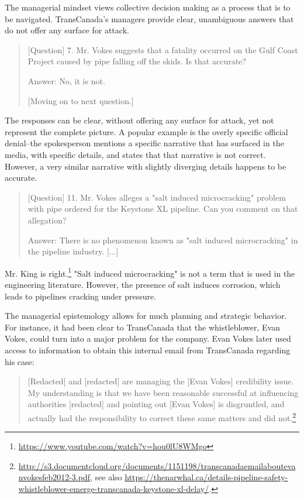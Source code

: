 \documentclass{article}
\begin{document}
	The managerial mindset views collective decision making as a process that is to be navigated. TransCanada's managers provide clear, unambiguous answers that do not offer any surface for attack.

	\begin{quote}
		[Question] 7. Mr. Vokes suggests that a fatality occurred on the Gulf Coast Project caused by pipe falling off the skids. Is that accurate? 

		Answer: No, it is not. 

		[Moving on to next question.]

		\citep[p. 4]{King2015a}
	\end{quote}

	The responses can be clear, without offering any surface for attack, yet not represent the complete picture. A popular example is the overly specific official denial--the spokesperson mentions a specific narrative that has surfaced in the media, with specific details, and states that that narrative is not correct. However, a very similar narrative with slightly diverging details happens to be accurate.

	\begin{quote}
		[Question] 11. Mr. Vokes alleges a "salt induced microcracking" problem with pipe ordered for the Keystone XL pipeline. Can you comment on that allegation? 

		Answer: There is no phenomenon known as "salt induced microcracking" in the pipeline industry. [...]

		\citep[p. 7]{King2015}
	\end{quote}

	Mr. King is right.\footnote{\url{https://www.youtube.com/watch?v=hou0lU8WMgo}} "Salt induced microcracking" is not a term that is used in the engineering literature. However, the presence of salt induces corrosion, which leads to pipelines cracking under pressure.

	The managerial epistemology allows for much planning and strategic behavior. For instance, it had been clear to TransCanada that the whistleblower, Evan Vokes, could turn into a major problem for the company. Evan Vokes later used access to information to obtain this internal email from TransCanada regarding his case:\clearpage %

	\begin{quote}
		[Redacted] and [redacted] are managing the [Evan Vokes] credibility issue. My understanding is that we have been reasonable successful at influencing authorities [redacted] and pointing out [Evan Vokes] is disgruntled, and actually had the responsibility to correct these same matters and did not.\footnote{\url{http://s3.documentcloud.org/documents/1151198/transcanadaemailaboutevanvokesfeb2012-3.pdf}, see also \url{https://thenarwhal.ca/details-pipeline-safety-whistleblower-emerge-transcanada-keystone-xl-delay/}.}
	\end{quote}
\end{document}
